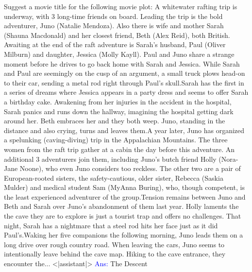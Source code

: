 \documentclass{article}
\begin{document}
\begin{tcolorbox}[colframe=black,colback=white]
Suggest a movie title for the following movie plot: A whitewater rafting trip is underway, with 3 long-time friends on board. Leading the trip is the bold adventurer, Juno (Natalie Mendoza). Also there is wife and mother Sarah (Shauna Macdonald) and her closest friend, Beth (Alex Reid), both British. Awaiting at the end of the raft adventure is Sarah's husband, Paul (Oliver Milburn) and daughter, Jessica (Molly Kayll). Paul and Juno share a strange moment before he drives to go back home with Sarah and Jessica. While Sarah and Paul are seemingly on the cusp of an argument, a small truck plows head-on to their car, sending a metal rod right through Paul's skull.Sarah has the first in a series of dreams where Jessica appears in a party dress and seems to offer Sarah a birthday cake. Awakening from her injuries in the accident in the hospital, Sarah panics and runs down the hallway, imagining the hospital getting dark around her. Beth embraces her and they both weep. Juno, standing in the distance and also crying, turns and leaves them.A year later, Juno has organized a spelunking (caving-diving) trip in the Appalachian Mountains. The three women from the raft trip gather at a cabin the day before this adventure. An additional 3 adventurers join them, including Juno's butch friend Holly (Nora-Jane Noone), who even Juno considers too reckless. The other two are a pair of European-rooted sisters, the safety-cautious, older sister, Rebecca (Saskia Mulder) and medical student Sam (MyAnna Buring), who, though competent, is the least experienced adventurer of the group.Tension remains between Juno and Beth and Sarah over Juno's abandonment of them last year. Holly laments the the cave they are to explore is just a tourist trap and offers no challenges. That night, Sarah has a nightmare that a steel rod hits her face just as it did Paul's.Waking her five companions the following morning, Juno leads them on a long drive over rough country road. When leaving the cars, Juno seems to intentionally leave behind the cave map. Hiking to the cave entrance, they encounter the...
<|assistant|>
\textcolor{blue}{Ans}\textcolor{blue}{:} The Descent\textcolor{blue}{}
\end{tcolorbox}
\end{document}
